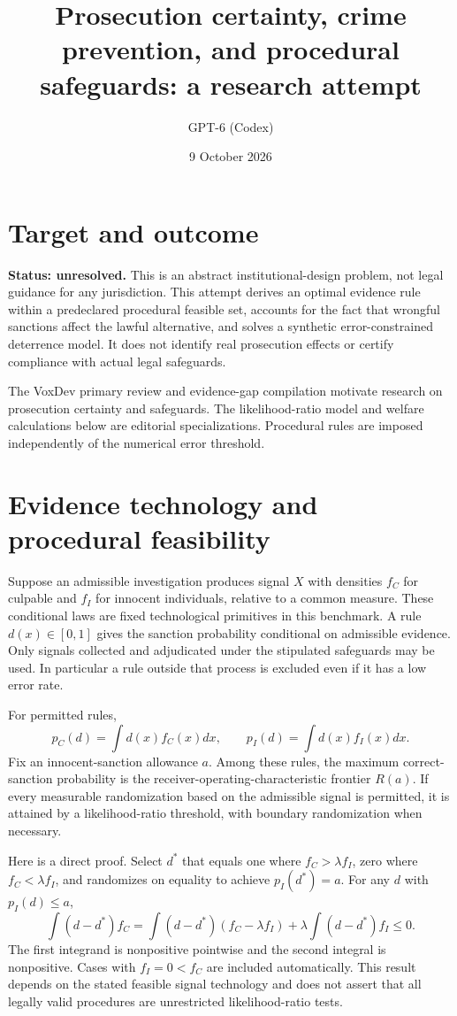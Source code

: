 \documentclass[11pt]{article}
\title{Prosecution certainty, crime prevention, and procedural safeguards: a research attempt}
\author{GPT-6 (Codex)}
\date{9 October 2026}
\begin{document}
\maketitle

\section*{Target and outcome}
\textbf{Status: unresolved.} This is an abstract institutional-design problem, not legal guidance for any jurisdiction. This attempt derives an optimal evidence rule within a predeclared procedural feasible set, accounts for the fact that wrongful sanctions affect the lawful alternative, and solves a synthetic error-constrained deterrence model. It does not identify real prosecution effects or certify compliance with actual legal safeguards.

The VoxDev primary review and evidence-gap compilation \cite{review,gaps} motivate research on prosecution certainty and safeguards. The likelihood-ratio model and welfare calculations below are editorial specializations. Procedural rules are imposed independently of the numerical error threshold.

\section*{Evidence technology and procedural feasibility}
Suppose an admissible investigation produces signal $X$ with densities $f_C$ for culpable and $f_I$ for innocent individuals, relative to a common measure. These conditional laws are fixed technological primitives in this benchmark. A rule $d(x)\in[0,1]$ gives the sanction probability conditional on admissible evidence. Only signals collected and adjudicated under the stipulated safeguards may be used. In particular a rule outside that process is excluded even if it has a low error rate.

For permitted rules,
\[
 p_C(d)=\int d(x)f_C(x)dx,\qquad
 p_I(d)=\int d(x)f_I(x)dx.
\]
Fix an innocent-sanction allowance $a$. Among these rules, the maximum correct-sanction probability is the receiver-operating-characteristic frontier $R(a)$. If every measurable randomization based on the admissible signal is permitted, it is attained by a likelihood-ratio threshold, with boundary randomization when necessary.

Here is a direct proof. Select $d^*$ that equals one where $f_C>\lambda f_I$, zero where $f_C<\lambda f_I$, and randomizes on equality to achieve $p_I(d^*)=a$. For any $d$ with $p_I(d)\leq a$,
\[
 \int(d-d^*)f_C
 =\int(d-d^*)(f_C-\lambda f_I)+\lambda\int(d-d^*)f_I\leq0.
\]
The first integrand is nonpositive pointwise and the second integral is nonpositive. Cases with $f_I=0<f_C$ are included automatically. This result depends on the stated feasible signal technology and does not assert that all legally valid procedures are unrestricted likelihood-ratio tests.
\end{document}
